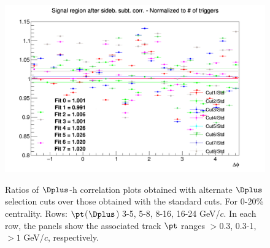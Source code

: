 \begin{figure}
{\includegraphics[width=0.31\linewidth]{Centrality_DPlus/Dplus/Systematic/0_20/Cut/Ratio_AzimCorrDistr_Dplus_Canvas_PtIntBins11to11_PoolInt_thr1dotto99dot.png}} \\
 \caption{Ratios of $\Dplus$-h correlation plots obtained with alternate $\Dplus$ selection cuts over those obtained with the standard cuts. For 0-20\% centrality. Rows: $\pt$($\Dplus$) 3-5, 5-8, 8-16, 16-24 GeV/$c$. In each row, the panels show the associated track
$\pt$ ranges $> 0.3$, 0.3-1, $> 1$ GeV/$c$, respectively.}
\label{fig:SysDcut020_Dplus}
\end{figure}

